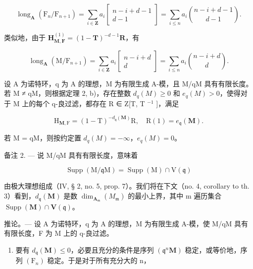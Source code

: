 \[
\operatorname{long} _ {\mathbf {A}} \left(\mathrm{F} _ {n} / \mathrm{F} _ {n + 1}\right) = \sum_ {i \in \mathbf {Z}} a _ {i} \left[ \begin{array}{c} n - i + d - 1 \\ d - 1 \end{array} \right] = \sum_ {i \leqslant n} a _ {i} \binom {n - i + d - 1} {d - 1}.\tag{11}
\]

类似地，由于 \(\mathbf{H}_{\mathbf{M},\mathbf{F}}^{(1)} = (1 - \mathbf{T})^{-d - 1}\mathbf{R}\)，有

\[
\operatorname{long} _ {\mathbf {A}} \left(\mathrm{M} / \mathrm{F} _ {n + 1}\right) = \sum_ {i \in \mathbf {Z}} a _ {i} \left[ \begin{array}{c} n - i + d \\ d \end{array} \right] = \sum_ {i \leqslant n} a _ {i} \binom {n - i + d} {d}.\tag{12}
\]

设 A 为诺特环，q 为 A 的理想，M 为有限生成 A-模，且 M/qM 具有有限长度。若 M ≠ qM，则根据定理 2, b)，存在整数 \(d_{q}(M) \geqslant 0\) 和 \(e_{q}(M) > 0\)，使得对于 M 上的每个 q-良过滤，都存在 R ∈ Z{[}T, T \(^{-1}\) {]}，满足

\[
\mathrm{H} _ {\mathbf {M}, \mathrm{F}} = (1 - \mathrm{T}) ^ {- d _ {\mathfrak {q}} (\mathbf {M})} \mathrm{R}, \quad \mathrm{R} (1) = e _ {\mathfrak {q}} (\mathbf {M}).
\]

若 M = qM，则按约定置 \(d_{q}(M) = -\infty\)，\(e_{q}(M) = 0\)。

备注 2. --- 说 M/qM 具有有限长度，意味着

\[
\operatorname{Supp} (\mathrm{M} / \mathfrak {q} \mathrm{M}) = \operatorname{Supp} (\mathrm{M}) \cap \mathrm{V} (\mathfrak {q})
\]

由极大理想组成（IV, § 2, no. 5, prop. 7）。我们将在下文（no. 4, corollary to th. 3）看到，\(d_{\mathfrak{q}}(\mathbf{M})\) 是数 \(\dim_{\mathbf{A}_{\mathfrak{m}}}(M_{\mathfrak{m}})\) 的最小上界，其中 m 遍历集合 \(\operatorname{Supp}(\mathbf{M}) \cap \mathbf{V}(\mathfrak{q})\)。

推论。— 设 A 为诺特环，q 为 A 的理想，M 为有限生成 A-模，使 M/qM 具有有限长度，F 为 M 上的 q-良过滤。

\begin{enumerate}
\def\labelenumi{\alph{enumi})}
\tightlist
\item
  要有 \(d_{\mathfrak{q}}(\mathbf{M}) \leqslant 0\)，必要且充分的条件是序列 \((\mathfrak{q}^{n}\mathbf{M})\) 稳定，或等价地，序列 \((\mathrm{F}_{n})\) 稳定。于是对于所有充分大的 n，
\end{enumerate}

